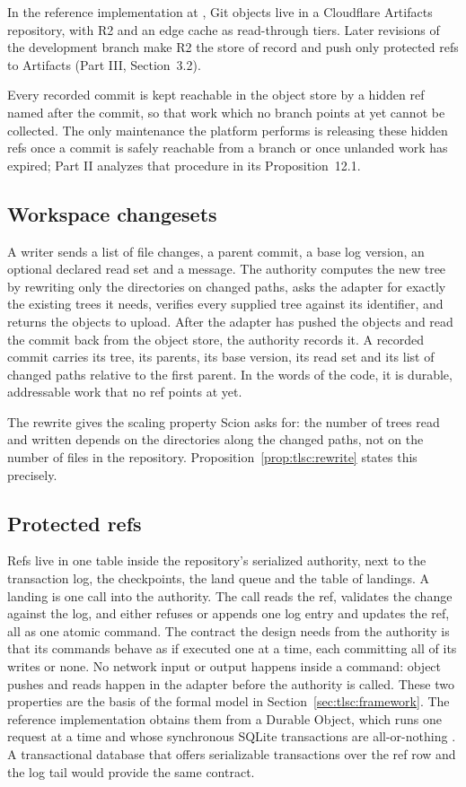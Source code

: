 \documentclass[11pt,letterpaper]{article}
\theoremstyle{definition}
\theoremstyle{remark}
\begin{document}
In the reference implementation at , Git objects live in a Cloudflare Artifacts repository, with R2 and an edge cache as read-through tiers. Later revisions of the development branch make R2 the store of record and push only protected refs to Artifacts (Part III, Section~3.2).

Every recorded commit is kept reachable in the object store by a hidden ref named after the commit, so that work which no branch points at yet cannot be collected. The only maintenance the platform performs is releasing these hidden refs once a commit is safely reachable from a branch or once unlanded work has expired; Part II analyzes that procedure in its Proposition~12.1.

\subsection{Workspace changesets}

A writer sends a list of file changes, a parent commit, a base log version, an optional declared read set and a message. The authority computes the new tree by rewriting only the directories on changed paths, asks the adapter for exactly the existing trees it needs, verifies every supplied tree against its identifier, and returns the objects to upload. After the adapter has pushed the objects and read the commit back from the object store, the authority records it. A recorded commit carries its tree, its parents, its base version, its read set and its list of changed paths relative to the first parent. In the words of the code, it is durable, addressable work that no ref points at yet.

The rewrite gives the scaling property Scion asks for: the number of trees read and written depends on the directories along the changed paths, not on the number of files in the repository. Proposition~\ref{prop:tlsc:rewrite} states this precisely.

\subsection{Protected refs}

Refs live in one table inside the repository's serialized authority, next to the transaction log, the checkpoints, the land queue and the table of landings. A landing is one call into the authority. The call reads the ref, validates the change against the log, and either refuses or appends one log entry and updates the ref, all as one atomic command. The contract the design needs from the authority is that its commands behave as if executed one at a time, each committing all of its writes or none. No network input or output happens inside a command: object pushes and reads happen in the adapter before the authority is called. These two properties are the basis of the formal model in Section~\ref{sec:tlsc:framework}. The reference implementation obtains them from a Durable Object, which runs one request at a time and whose synchronous SQLite transactions are all-or-nothing \cite{cfdoconcepts,cfdosqlite}. A transactional database that offers serializable transactions over the ref row and the log tail would provide the same contract.
\end{document}
